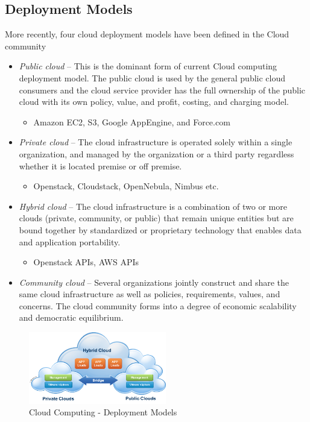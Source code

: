 \documentclass[12pt]{report}
\begin{document}
\subsection{Deployment Models}

More recently, four cloud deployment models have been defined in the Cloud community

\begin{itemize}
\item \textit{Public cloud} -- This is the dominant form of current Cloud computing deployment model. The public cloud is used by the general public cloud consumers and the cloud service provider has the full ownership of the public cloud with its own policy, value, and profit, costing, and charging model.
\begin{itemize}
	\item   Amazon EC2, S3, Google AppEngine, and Force.com
\end{itemize}

\item\textit{ Private cloud }-- The cloud infrastructure is operated solely within a single organization, and managed by the organization or a third party regardless whether it is located premise or off premise.
\begin{itemize}
	\item   Openstack, Cloudstack, OpenNebula, Nimbus etc.
\end{itemize}
\item \textit{Hybrid cloud }-- The cloud infrastructure is a combination of two or more clouds (private, community, or public) that remain unique entities but are bound together by standardized or proprietary technology that enables data and application portability.
\begin{itemize}
	\item   Openstack APIs, AWS APIs
\end{itemize}
\item \textit{Community cloud} -- Several organizations jointly construct and share the same cloud infrastructure as well as policies, requirements, values, and concerns. The cloud community forms into a degree of economic scalability and democratic equilibrium.
\end{itemize}

\begin{figure}[H]
 \centering
 \includegraphics[width=6cm]{./model.png}
 \caption{Cloud Computing - Deployment Models \label{fig:model} }
\end{figure}
\end{document}
